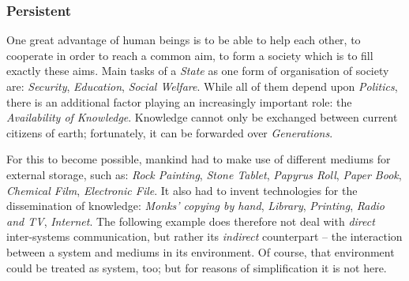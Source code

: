 %
%
%
%
%
%
%

\subsubsection{Persistent}
\label{persistent_heading}

One great advantage of human beings is to be able to help each other, to
cooperate in order to reach a common aim, to form a society which is to fill
exactly these aims. Main tasks of a \emph{State} as one form of organisation of
society are: \emph{Security}, \emph{Education}, \emph{Social Welfare}. While
all of them depend upon \emph{Politics}, there is an additional factor playing
an increasingly important role: the \emph{Availability of Knowledge}. Knowledge
cannot only be exchanged between current citizens of earth; fortunately, it can
be forwarded over \emph{Generations}.

For this to become possible, mankind had to make use of different mediums for
external storage, such as: \emph{Rock Painting}, \emph{Stone Tablet},
\emph{Papyrus Roll}, \emph{Paper Book}, \emph{Chemical Film},
\emph{Electronic File}. It also had to invent technologies for the
dissemination of knowledge: \emph{Monks' copying by hand}, \emph{Library},
\emph{Printing}, \emph{Radio and TV}, \emph{Internet}. The following example
does therefore not deal with \emph{direct} inter-systems communication, but
rather its \emph{indirect} counterpart -- the interaction between a system and
mediums in its environment. Of course, that environment could be treated as
system, too; but for reasons of simplification it is not here.

